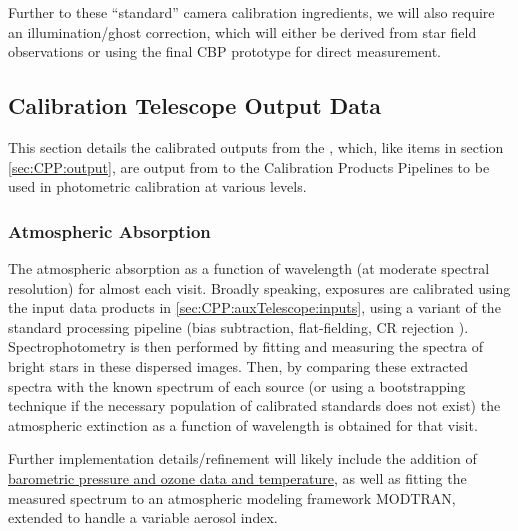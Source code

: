 Further to these ``standard'' camera calibration ingredients, we will also require an illumination/ghost correction, which will either be derived from star field observations or using the final CBP prototype for direct measurement.









\subsection{Calibration Telescope Output Data}
\label{sec:CPP:auxTelescope:outputs}
This section details the calibrated outputs from the \auxtelescope, which, like items in section \secsymbol\ref{sec:CPP:output}, are output from to the Calibration Products Pipelines to be used in photometric calibration at various levels.


\subsubsection{Atmospheric Absorption}\label{sec:CPP:aux:atmosphericAbsorption}
The atmospheric absorption as a function of wavelength (at moderate spectral resolution) for almost each visit.
\alg Broadly speaking, exposures are calibrated using the input data products in \secsymbol\ref{sec:CPP:auxTelescope:inputs}, using a variant of the standard processing pipeline (bias subtraction, flat-fielding, CR rejection \etc). Spectrophotometry is then performed by fitting and measuring the spectra of bright stars in these dispersed images. Then, by comparing these extracted spectra with the known spectrum of each source (or using a bootstrapping technique if the necessary population of calibrated standards does not exist) the atmospheric extinction as a function of wavelength is obtained for that visit.

Further implementation details/refinement will likely include the addition of \hyperref[sec:CPP:inputs:atmosphericData]{barometric pressure and ozone data and temperature}, as well as fitting the measured spectrum to an atmospheric modeling framework \eg MODTRAN, extended to handle a variable aerosol index. 


